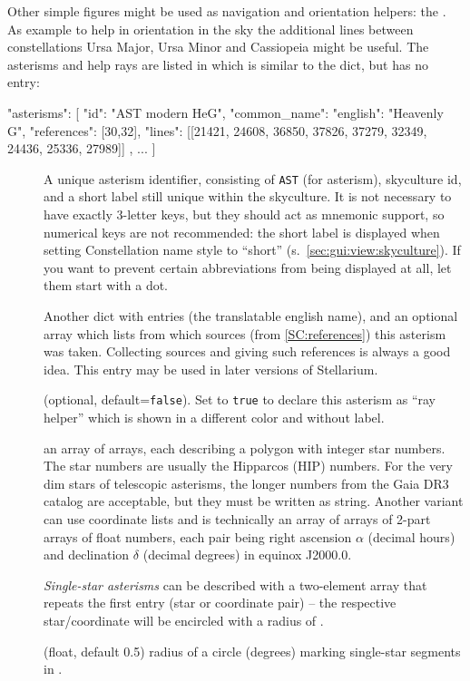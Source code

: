 Other simple figures might be used as navigation and orientation helpers: the . 
As example to help in orientation in the sky the additional lines between constellations 
Ursa Major, Ursa Minor and Cassiopeia might be useful. The asterisms and help rays are listed in
 which is similar to the  dict, but has no  entry:

\begin{jsonfile}[\scriptsize]
"asterisms": [
    {
      "id": "AST modern HeG",
      "common_name": {"english": "Heavenly G", "references": [30,32]},
      "lines": [[21421, 24608, 36850, 37826, 37279, 32349, 24436, 25336, 27989]]
    }, ...
]
\end{jsonfile}

\begin{description}
\item[] A unique asterism identifier, consisting of \texttt{AST} (for asterism), skyculture id, and a short label still unique within the skyculture.
                 It is not necessary to have exactly 3-letter keys, but they should act as mnemonic support, so numerical keys are not recommended:  
				 the short label is displayed when setting Constellation name style to ``short'' (s.~\ref{sec:gui:view:skyculture}). If you want to prevent
				 certain abbreviations from being displayed at all, let them start with a dot. 				 
\item[] Another dict with entries  (the translatable english name), 
				and an optional array  which lists from which sources (from \ref{SC:references}) this asterism was taken. 
				Collecting sources and giving such references is always a good idea. This entry may be used in later versions of Stellarium.
\item[] (optional, default=\texttt{false}). 
                Set to \texttt{true} to declare this asterism as ``ray helper'' which is shown in a different color and without label. 
\item[] an array of arrays, each describing a polygon with integer star numbers. The star numbers are usually the Hipparcos (HIP) numbers. 
                    For the very dim stars of telescopic asterisms, the longer numbers from the Gaia DR3 catalog are acceptable, but they must be written as string.
					Another variant can use coordinate lists and is technically an array of arrays of 2-part arrays of float numbers, 
					each pair being right ascension $\alpha$ (decimal hours) and declination $\delta$ (decimal degrees) in equinox J2000.0. 

					\emph{Single-star asterisms}  can be described with a two-element array that repeats the first entry (star or coordinate pair)
					-- the respective star/coordinate will be encircled with a radius of .
\item[] (float, default 0.5)  radius of a circle (degrees) marking single-star segments in .
\end{description}
